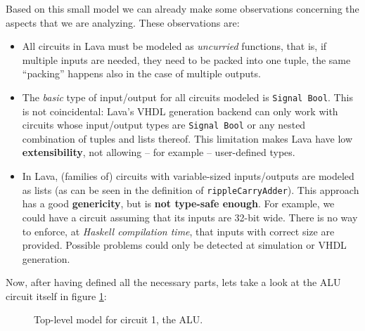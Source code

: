 \documentclass[a4paper]{article}
\begin{document}
                Based on this small model we can already make some observations concerning the
                aspects that we are analyzing. These observations are:
                \begin{itemize}
                    \item All circuits in Lava must be modeled as \emph{uncurried} functions, that
                        is, if multiple inputs are needed, they need to be packed into one tuple, the
                        same ``packing'' happens also in the case of multiple outputs.

                    \item The \emph{basic} type of input/output for all circuits modeled is
                        \texttt{Signal Bool}. This is not coincidental: Lava's VHDL generation
                        backend can only work with circuits whose input/output types are
                        \texttt{Signal Bool} or any nested combination of tuples and lists thereof.
                        This limitation makes Lava have low \textbf{extensibility}, not allowing
                        -- for example -- user-defined types.

                    \item In Lava, (families of) circuits with variable-sized inputs/outputs are
                        modeled as lists (as can be seen in the definition of
                        \texttt{rippleCarryAdder}). This approach has a good \textbf{genericity},
                        but is \textbf{not type-safe enough}. For example, we could have a circuit
                        assuming that its inputs are 32-bit wide.  There is no way to enforce, at
                        \emph{Haskell compilation time}, that inputs with correct size are
                        provided.  Possible problems could only be detected at simulation or VHDL
                        generation.
                \end{itemize}

                Now, after having defined all the necessary parts, lets take a look at the
                ALU circuit itself in figure \ref{fig:lava-circuit1-model-alu}:
                \begin{figure}[h!]
                    \begin{center}
                    \end{center}
                    \caption{Top-level model for circuit 1, the ALU.
                        \label{fig:lava-circuit1-model-alu}}
                \end{figure}
\end{document}
